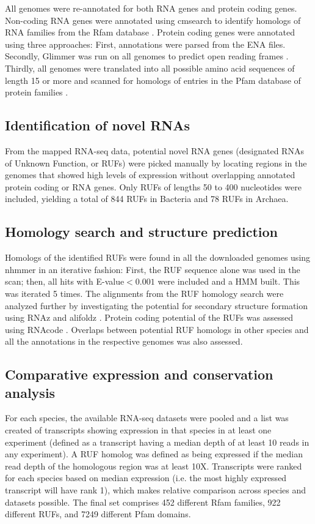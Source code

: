 \documentclass[10pt]{article}
\begin{document}
All genomes were re-annotated for both RNA genes and protein coding
genes. Non-coding RNA genes were annotated using cmsearch
\cite{Nawrocki:2013} to identify homologs of RNA families from the
Rfam database \cite{Gardner:2011,Burge:2013}. Protein coding genes
were annotated using three approaches: First, annotations were parsed
from the ENA files. Secondly, Glimmer was run on all genomes to
predict open reading frames \cite{Delcher:2007}. Thirdly, all genomes
were translated into all possible amino acid sequences of length 15 or
more and scanned for homologs of entries in the Pfam database of
protein families \cite{Punta:2012,Finn:2014}.

\subsection*{Identification of novel RNAs}

From the mapped RNA-seq data, potential novel RNA genes (designated
RNAs of Unknown Function, or RUFs) were picked manually by locating
regions in the genomes that showed high levels of expression without
overlapping annotated protein coding or RNA genes. Only RUFs of
lengths 50 to 400 nucleotides were included, yielding a total of 844
RUFs in Bacteria and 78 RUFs in Archaea.

\subsection*{Homology search and structure prediction}

Homologs of the identified RUFs were found in all the downloaded
genomes using nhmmer \cite{Wheeler:2013} in an iterative fashion:
First, the RUF sequence alone was used in the scan; then, all hits
with E-value$<0.001$ were included and a HMM built. This was iterated
5 times. The alignments from the RUF homology search were analyzed
further by investigating the potential for secondary structure
formation using RNAz \cite{Gruber:2010} and alifoldz
\cite{Washietl:2004}. Protein coding potential of the RUFs was
assessed using RNAcode \cite{Washietl:2011}. Overlaps between
potential RUF homologs in other species and all the annotations in the
respective genomes was also assessed.

\subsection*{Comparative expression and conservation analysis}

For each species, the available RNA-seq datasets were pooled and a
list was created of transcripts showing expression in that species in
at least one experiment (defined as a transcript having a median depth
of at least 10 reads in any experiment). A RUF homolog was defined as
being expressed if the median read depth of the homologous region was
at least 10X. Transcripts were ranked for each species based on median
expression (i.e. the most highly expressed transcript will have rank
1), which makes relative comparison across species and datasets
possible. The final set comprises 452 different Rfam families, 922
different RUFs, and 7249 different Pfam domains.
\end{document}
